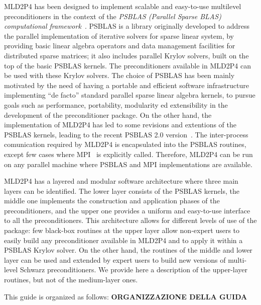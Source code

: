 MLD2P4 has been designed to implement scalable and easy-to-use multilevel preconditioners
in the context of the \emph{PSBLAS (Parallel Sparse BLAS) computational framework}~\cite{psblas_00}.
PSBLAS is a library originally developed to address the parallel implementation of
iterative solvers for sparse linear system, by providing basic linear algebra
operators and data management facilities for distributed sparse matrices; it
also includes parallel Krylov solvers, built on the top of the basic PSBLAS kernels.
The preconditioners available in MLD2P4 can be used with these Krylov solvers.
The choice of PSBLAS has been mainly motivated by the need of having
a portable and efficient software infrastructure implementing ``de facto'' standard
parallel sparse linear algebra kernels, to pursue goals such as performance,
portability, modularity ed extensibility in the development of the preconditioner
package. On the other hand, the implementation of MLD2P4 has led to some
revisions and extentions of the PSBLAS kernels, leading to the
recent PSBLAS 2.0 version~\cite{PSBLASGUIDE}. The inter-process comunication required
by MLD2P4 is encapsulated into the PSBLAS routines, except few cases where
MPI~\cite{MPI1} is explicitly called. Therefore, MLD2P4 can be run on any parallel
machine where PSBLAS and MPI implementations are available.

MLD2P4 has a layered and modular software architecture where three main layers can be identified. 
The lower layer consists of the PSBLAS kernels, the middle one implements
the construction and application phases of the preconditioners, and the upper one
provides a uniform and easy-to-use interface to all the preconditioners. 
This architecture allows for different levels of use of the package:
few black-box routines at the upper layer allow non-expert users to easily
build any preconditioner available in MLD2P4 and to apply it within a PSBLAS Krylov solver.
On the other hand, the routines of the middle and lower layer can be used and extended
by expert users to build new versions of multi-level Schwarz preconditioners.
We provide here a description of the upper-layer routines, but not of the
medium-layer ones.

This guide is organized as follows: \textbf{ORGANIZZAZIONE DELLA GUIDA}

